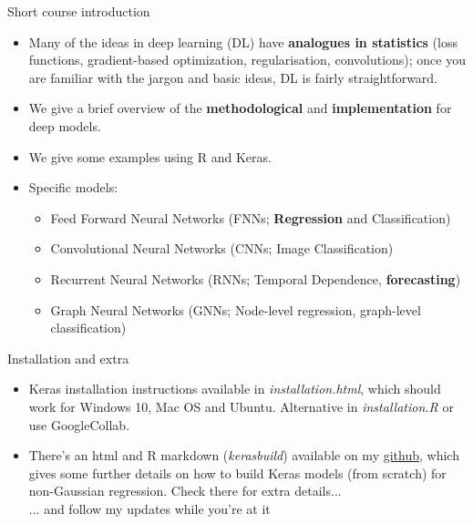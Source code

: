 \documentclass{beamer}
\begin{document}
\begin{frame}{Short course introduction}
\begin{itemize}
\item Many of the ideas in deep learning (DL) have \textbf{analogues in statistics} (loss functions, gradient-based optimization, regularisation, convolutions); once you are familiar with the jargon and basic ideas, DL is fairly straightforward.
\vfill
\item We give a brief overview of the \textbf{methodological} and \textbf{implementation} for deep models.
\vfill
\item We give some examples using $\mathrm{R}$ and Keras.
\vfill
\item Specific models:
\begin{itemize}
\item Feed Forward Neural Networks (FNNs; \textbf{Regression} and Classification)

\item Convolutional Neural Networks (CNNs; Image Classification)

\item Recurrent Neural Networks (RNNs; Temporal Dependence, \textbf{forecasting})
\item Graph Neural Networks (GNNs;  Node-level regression, graph-level classification)
\end{itemize}
\end{itemize}
\end{frame}
\begin{frame}{Installation and extra}
\begin{itemize}
\item Keras installation instructions available in \textit{installation.html}, which should work for Windows 10, Mac OS and Ubuntu. Alternative in \textit{installation.R} or use GoogleCollab.
\vfill 
\item There's an html and R markdown (\textit{keras\textunderscore build}) available on my \href{https://github.com/Jbrich95/cde-RKeras-intro/tree/main/keras_build}{github}, which gives some further details on how to build Keras models (from scratch) for non-Gaussian regression. Check there for extra details...\\
\tiny ... and follow my updates while you're at it
\end{itemize}
\end{frame}
\end{document}
